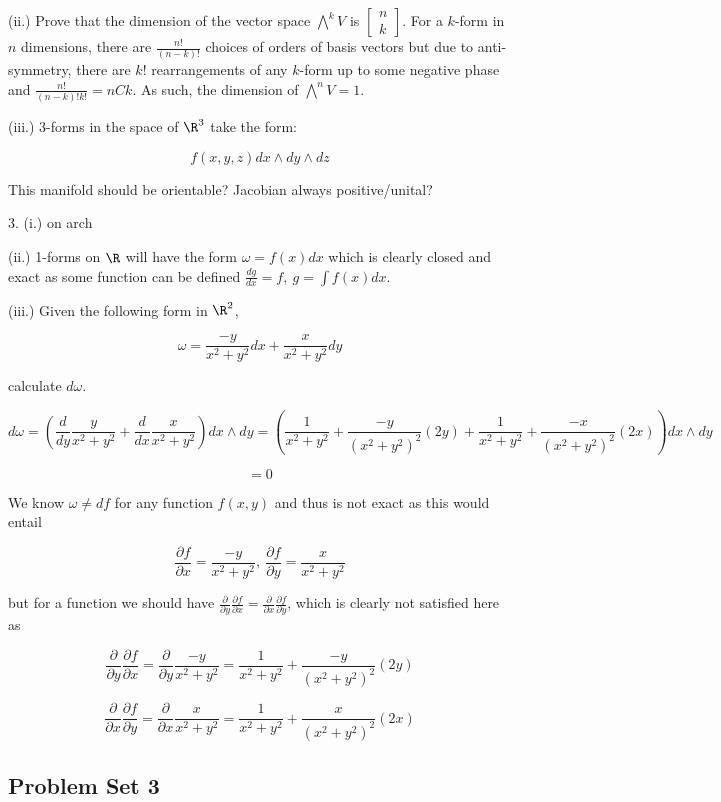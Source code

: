 \documentclass{article}
\begin{document}
(ii.) Prove that the dimension of the vector space $\bigwedge^k V$ is 
$\begin{bmatrix}
n \\
k
\end{bmatrix}
$.
For a $k$-form in $n$ dimensions, there are $\frac{n!}{(n-k)!}$ choices of orders of basis vectors but due to anti-symmetry,   
there are $k!$ rearrangements of any $k$-form up to some negative phase and $\frac{n!}{(n-k)!k!}=nCk$. As such, the dimension of $\bigwedge^n V=1$.

(iii.) 3-forms in the space of $\R^3$ take the form:

$$
f(x,y,z)dx\wedge dy\wedge dz
$$

This manifold should be orientable? Jacobian always positive/unital?

3. (i.) on arch

(ii.) 1-forms on $\R$ will have the form $\omega=f(x)dx$ which is clearly closed and exact as some function can be defined $\frac{dg}{dx}=f,\ g=\int f(x) dx$.

(iii.) Given the following form in $\R^2$, 

$$
\omega=\frac{-y}{x^2+y^2}dx + \frac{x}{x^2+y^2}dy
$$

calculate $d\omega$.

$$
d\omega=\left(\frac{d}{dy}\frac{y}{x^2+y^2}+\frac{d}{dx}\frac{x}{x^2+y^2}\right) dx\wedge dy=\left(\frac{1}{x^2+y^2}+\frac{-y}{(x^2+y^2)^2}(2y)+\frac{1}{x^2+y^2}+\frac{-x}{(x^2+y^2)^2}(2x)\right) dx\wedge dy
$$

$$
=0
$$

We know $\omega\neq df$ for any function $f(x,y)$ and thus is not exact as this would entail 

$$
\frac{\partial f}{\partial x}=\frac{-y}{x^2+y^2},\ \frac{\partial f}{\partial y}=\frac{x}{x^2+y^2}
$$

but for a function we should have $\frac{\partial }{\partial y}\frac{\partial f}{\partial x}=\frac{\partial }{\partial x}\frac{\partial f}{\partial y}$, which is clearly not satisfied here as

$$
\frac{\partial }{\partial y}\frac{\partial f}{\partial x}=\frac{\partial }{\partial y}\frac{-y}{x^2+y^2}=\frac{1}{x^2+y^2}+\frac{-y}{(x^2+y^2)^2}(2y)
$$

$$
\frac{\partial }{\partial x}\frac{\partial f}{\partial y}=\frac{\partial }{\partial x}\frac{x}{x^2+y^2}=\frac{1}{x^2+y^2}+\frac{x}{(x^2+y^2)^2}(2x)
$$




\subsection{Problem Set 3}
\end{document}
